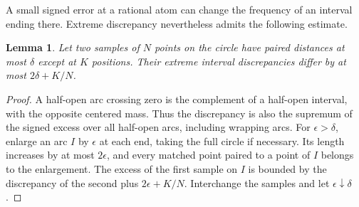 \documentclass[11pt]{article}
\newtheorem{lemma}[theorem]{Lemma}
\begin{document}
A small signed error at a rational atom can change the frequency of an interval ending there. Extreme discrepancy nevertheless admits the following estimate.
\begin{lemma}\label{lem:perturb}
Let two samples of \(N\) points on the circle have paired distances at most \(\delta\) except at \(K\) positions. Their extreme interval discrepancies differ by at most \(2\delta+K/N\).
\end{lemma}
\begin{proof}
A half-open arc crossing zero is the complement of a half-open interval, with the opposite centered mass. Thus the discrepancy is also the supremum of the signed excess over all half-open arcs, including wrapping arcs. For \(\epsilon>\delta\), enlarge an arc \(I\) by \(\epsilon\) at each end, taking the full circle if necessary. Its length increases by at most \(2\epsilon\), and every matched point paired to a point of \(I\) belongs to the enlargement. The excess of the first sample on \(I\) is bounded by the discrepancy of the second plus \(2\epsilon+K/N\). Interchange the samples and let \(\epsilon\downarrow\delta\).
\end{proof}
\end{document}

